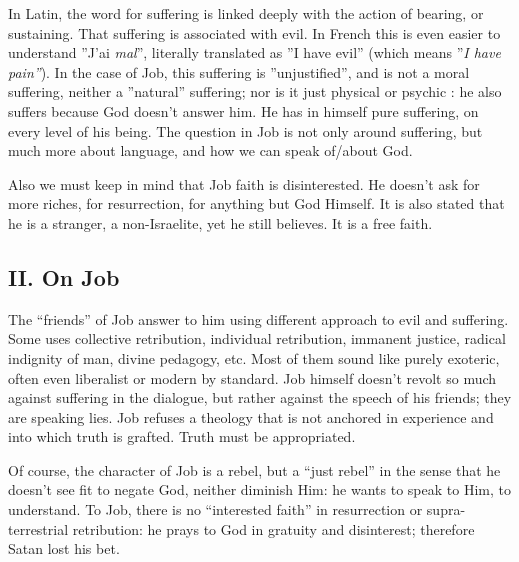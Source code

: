 In Latin, the word for suffering is linked deeply with the action of bearing, or sustaining. That suffering is associated with evil. In French this is even easier to understand ”J'ai \emph{mal}”, literally translated as ”I have evil” (which means ”\emph{I have pain”}). In the case of Job, this suffering is ”unjustified”, and is not a moral suffering, neither a ”natural” suffering; nor is it just physical or psychic : he also suffers because God doesn't answer him. He has in himself pure suffering, on every level of his being. The question in Job is not only around suffering, but much more about language, and how we can speak of/about God.

Also we must keep in mind that Job faith is disinterested. He doesn't ask for more riches, for resurrection, for anything but God Himself. It is also stated that he is a stranger, a non-Israelite, yet he still believes. It is a free faith.

\subsection*{II. On Job}

The ``friends” of Job answer to him using different approach to evil and suffering. Some uses collective retribution, individual retribution, immanent justice, radical indignity of man, divine pedagogy, etc. Most of them sound like purely exoteric, often even liberalist or modern by standard. Job himself doesn't revolt so much against suffering in the dialogue, but rather against the speech of his friends; they are speaking lies. Job refuses a theology that is not anchored in experience and into which truth is grafted. Truth must be appropriated.

Of course, the character of Job is a rebel, but a ``just rebel” in the sense that he doesn't see fit to negate God, neither diminish Him: he wants to speak to Him, to understand. To Job, there is no ``interested faith” in resurrection or supra-terrestrial retribution: he prays to God in gratuity and disinterest; therefore Satan lost his bet.

